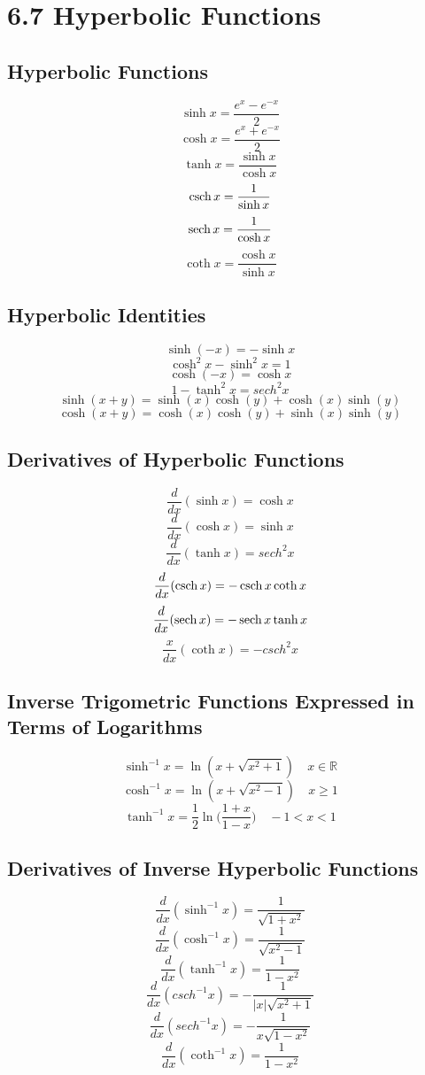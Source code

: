 %
%

\section*{6.7 Hyperbolic Functions}

\subsection*{Hyperbolic Functions}

\[ \sinh x = \frac{e^x-e^{-x}}{2} \]
\[ \cosh x = \frac{e^x + e^{-x}}{2} \]
\[ \tanh x = \frac{\sinh x}{\cosh x} \]
\[ \operatorname*{csch} x = \frac{1}{\sinh x} \]
\[ \operatorname*{sech} x = \frac{1}{\cosh x} \]
\[ \coth x = \frac{\cosh x}{\sinh x} \]

\subsection*{Hyperbolic Identities}

\[ \sinh(-x) = -\sinh x \]
\[ \cosh^2x - \sinh^2x = 1 \]
\[ \cosh(-x) = \cosh x \]
\[ 1 - \tanh^2x = {sech}^2 x \]
\[ \sinh(x+y) = \sinh(x) \cosh(y) + \cosh(x) \sinh(y) \]
\[ \cosh(x+y) = \cosh(x) \cosh(y) + \sinh(x) \sinh(y) \]

\subsection*{Derivatives of Hyperbolic Functions}

\[ \frac{d}{dx}(\sinh{x}) = \cosh{x} \]
\[ \frac{d}{dx}(\cosh{x}) = \sinh{x} \]
\[ \frac{d}{dx}(\tanh{x}) = {sech}^2 x \]
\[ \frac{d}{dx}(\operatorname*{csch}{x}) = - \operatorname*{csch}{x} \coth{x} \]
\[ \frac{d}{dx}(\operatorname*{sech}{x}) = - \operatorname*{sech}{x} \tanh{x} \]
\[ \frac{x}{dx}(\coth{x}) = - {csch}^2{x} \]

\subsection*{Inverse Trigometric Functions Expressed in Terms of Logarithms}

\[ \sinh^{-1}{x} = \ln(x+\sqrt{x^2 + 1}) \quad x \in \mathbb{R} \]
\[ \cosh^{-1}{x} = \ln(x + \sqrt{x^2-1}) \quad x \geq 1 \]
\[ \tanh^{-1}{x} = \frac{1}{2} \ln \bigg( \frac{1+x}{1-x} \bigg) \quad -1 < x < 1 \]

\subsection*{Derivatives of Inverse Hyperbolic Functions}

\[ \frac{d}{dx}(\sinh^{-1}x) = \frac{1}{\sqrt{1+x^2}} \]
\[ \frac{d}{dx}(\cosh^{-1}x) = \frac{1}{\sqrt{x^2 -1}} \]
\[ \frac{d}{dx}(\tanh^{-1}x) = \frac{1}{1-x^2} \]
\[ \frac{d}{dx}({csch}^{-1}x) = - \frac{1}{|x| \sqrt{x^2 + 1}} \]
\[ \frac{d}{dx}({sech}^{-1}x) = - \frac{1}{x \sqrt{1 - x^2}} \]
\[ \frac{d}{dx}(\coth^{-1}x) = \frac{1}{1-x^2} \]
